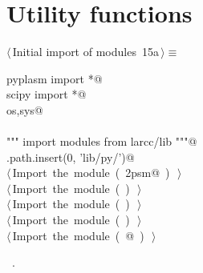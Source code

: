 \documentclass[11pt,oneside]{article}	%
\begin{document}


\appendix
\section{Utility functions}

\begin{flushleft} \small \label{scrap34}
\protect{}$\langle\,$Initial import of modules\nobreak\ {\footnotesize 15a}$\,\rangle\equiv$
\vspace{-1ex}
\begin{list}{}{} \item
\mbox{}\verb@from pyplasm import *@\\
\mbox{}\verb@from scipy import *@\\
\mbox{}\verb@import os,sys@\\
\mbox{}\verb@@\\
\mbox{}\verb@""" import modules from larcc/lib """@\\
\mbox{}\verb@sys.path.insert(0, 'lib/py/')@\\
\mbox{}\verb@@\hbox{$\langle\,$Import the module\nobreak\ ({\footnotesize {}\label{scrap35}
 }\mbox{}\verb@lar2psm@ ) {\footnotesize {}}$\,\rangle$}\verb@@\\
\mbox{}\verb@@\hbox{$\langle\,$Import the module\nobreak\ ({\footnotesize {}\label{scrap36}
 }\mbox{}\verb@simplexn@ ) {\footnotesize {}}$\,\rangle$}\verb@@\\
\mbox{}\verb@@\hbox{$\langle\,$Import the module\nobreak\ ({\footnotesize {}\label{scrap37}
 }\mbox{}\verb@larcc@ ) {\footnotesize {}}$\,\rangle$}\verb@@\\
\mbox{}\verb@@\hbox{$\langle\,$Import the module\nobreak\ ({\footnotesize {}\label{scrap38}
 }\mbox{}\verb@largrid@ ) {\footnotesize {}}$\,\rangle$}\verb@@\\
\mbox{}\verb@@\hbox{$\langle\,$Import the module\nobreak\ ({\footnotesize {}\label{scrap39}
 }\mbox{}@ ) {\footnotesize {}}$\,\rangle$}\verb@@\\
\mbox{}\verb@@{\NWsep}
\end{list}
\vspace{-1ex}
\footnotesize\addtolength{\baselineskip}{-1ex}
\begin{list}{}{\setlength{\itemsep}{-\parsep}\setlength{\itemindent}{-\leftmargin}}
\item \NWtxtMacroRefIn\ .
\end{list}
\end{flushleft}
\end{document}
